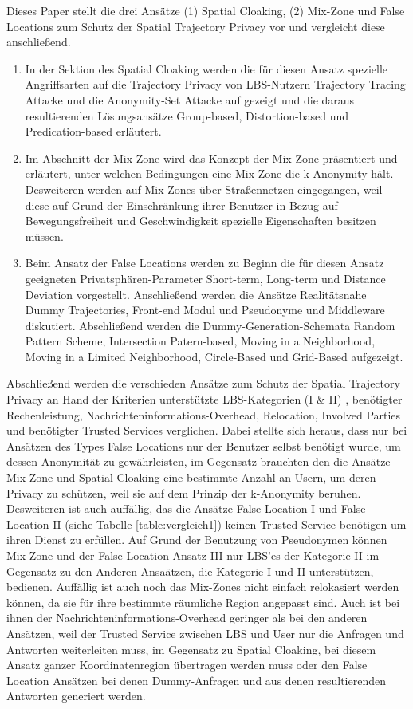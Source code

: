 Dieses Paper stellt die drei Ansätze (1) Spatial Cloaking, (2) Mix-Zone und False Locations zum Schutz der Spatial Trajectory Privacy vor und vergleicht diese anschließend.

\begin{enumerate}
	\item In der Sektion des Spatial Cloaking werden die für diesen Ansatz spezielle Angriffsarten auf die Trajectory Privacy von LBS-Nutzern Trajectory Tracing Attacke und die Anonymity-Set Attacke auf gezeigt und die daraus resultierenden Lösungsansätze  Group-based, Distortion-based und Predication-based erläutert.
	\item Im Abschnitt der Mix-Zone wird das Konzept der Mix-Zone präsentiert und erläutert, unter welchen Bedingungen eine Mix-Zone die k-Anonymity hält. Desweiteren werden auf Mix-Zones über Straßennetzen eingegangen, weil diese auf Grund der Einschränkung ihrer Benutzer in Bezug auf Bewegungsfreiheit und Geschwindigkeit spezielle Eigenschaften besitzen müssen.
	\item Beim Ansatz der False Locations werden zu Beginn die für diesen Ansatz geeigneten Privatsphären-Parameter Short-term, Long-term und Distance Deviation vorgestellt. Anschließend werden die Ansätze Realitätsnahe Dummy Trajectories, Front-end Modul und Pseudonyme und Middleware diskutiert. Abschließend werden die Dummy-Generation-Schemata Random Pattern Scheme, Intersection Patern-based,  Moving in a Neighborhood, Moving in a Limited Neighborhood, Circle-Based und Grid-Based aufgezeigt.
\end{enumerate}
Abschließend werden die verschieden Ansätze zum Schutz der Spatial Trajectory Privacy an Hand der Kriterien unterstützte LBS-Kategorien (I \& II) , benötigter Rechenleistung, Nachrichteninformations-Overhead, Relocation, Involved Parties und benötigter Trusted Services verglichen. Dabei stellte sich heraus, dass nur bei Ansätzen des Types False Locations nur der Benutzer selbst benötigt wurde, um dessen Anonymität zu gewährleisten, im Gegensatz brauchten den die Ansätze Mix-Zone und Spatial Cloaking eine bestimmte Anzahl an Usern, um deren Privacy zu schützen, weil sie auf dem Prinzip der k-Anonymity beruhen. Desweiteren ist auch auffällig, das die Ansätze False Location I und False Location II (siehe Tabelle \ref{table:vergleich1}) keinen Trusted Service benötigen um ihren Dienst zu erfüllen. Auf Grund der Benutzung von Pseudonymen können Mix-Zone und der False Location Ansatz III nur LBS’es der Kategorie II im Gegensatz zu den Anderen Ansaätzen, die Kategorie I und II unterstützen, bedienen. Auffällig ist auch noch das Mix-Zones nicht einfach relokasiert werden können, da sie für ihre bestimmte räumliche Region angepasst sind. Auch ist bei ihnen der Nachrichteninformations-Overhead geringer als bei den anderen Ansätzen, weil der Trusted Service zwischen LBS und User nur die Anfragen und Antworten weiterleiten muss, im Gegensatz zu Spatial Cloaking, bei diesem Ansatz ganzer Koordinatenregion übertragen werden muss oder den False Location Ansätzen bei denen Dummy-Anfragen und aus denen resultierenden Antworten generiert werden.    